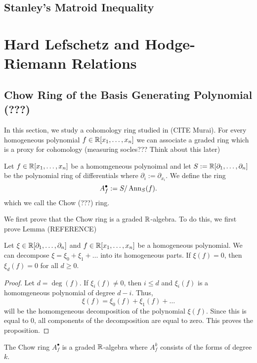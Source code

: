 \documentclass{puthesis-UG}
\begin{document}
\section{Stanley's Matroid Inequality}


\chapter{Hard Lefschetz and Hodge-Riemann Relations}

\section{Chow Ring of the Basis Generating Polynomial (???) }

In this section, we study a cohomology ring studied in (CITE Murai). For every homogeneous polynomial $f \in \mathbb{R}[x_1, \ldots, x_n]$ we can associate a graded ring which is a proxy for cohomology (measuring socles??? Think about this later)

\begin{defn}
	Let $f \in \mathbb{R}[x_1, \ldots, x_n]$ be a homomgeneous polynoimal and let $S := \mathbb{R}[\partial_1, \ldots, \partial_n]$ be the polynomial ring of differentials where $\partial_i := \partial_{x_i}$. We define the ring 
	\[
		A_f^\bullet := S / \operatorname{Ann}_S (f).
	\]
	which we call the Chow (???) ring. 
\end{defn}

We first prove that the Chow ring is a graded $\mathbb{R}$-algebra. To do this, we first prove Lemma (REFERENCE)

\begin{lem} \label{homogeneous-parts}
	Let $\xi \in \mathbb{R}[\partial_1, \ldots, \partial_n]$ and $f \in \mathbb{R}[x_1, \ldots, x_n]$ be a homogeneous polynomial. We can decompose $\xi = \xi_0 + \xi_1 + \ldots$ into its homogeneous parts. If $\xi (f) = 0$, then $\xi_d (f) = 0$ for all $d \geq 0$. 
\end{lem}

\begin{proof}
	Let $d = \deg (f)$. If $\xi_i (f) \neq 0$, then $i \leq d$ and $\xi_i(f)$ is a homomgeneous polynomial of degree $d-i$. Thus, 
	\[
		\xi (f) = \xi_0 (f) + \xi_1(f) + \ldots
	\]
	will be the homomgeneous decomposition of the polynomial $\xi(f)$. Since this is equal to $0$, all components of the decomposition are equal to zero. This proves the proposition. 
\end{proof}

\begin{prop}
	The Chow ring $A_f^\bullet$ is a graded $\mathbb{R}$-algebra where $A_f^k$ consists of the forms of degree $k$. 
\end{prop}
\end{document}
